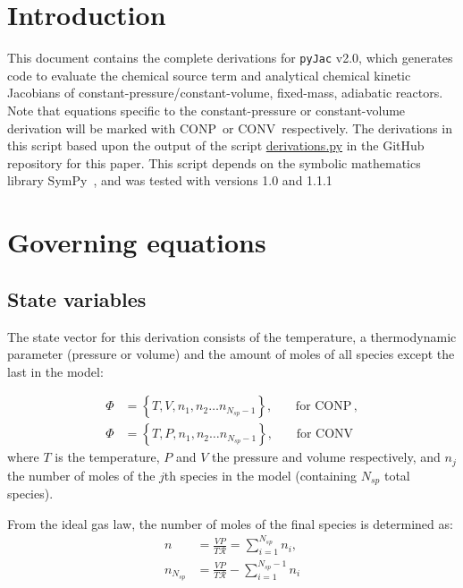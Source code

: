 \documentclass[12pt]{article}
\newcommand{\ns}{\ensuremath{{N_{sp}}}}
\newcommand{\conp}{CONP}
\newcommand{\conv}{CONV}
\newcommand{\dconp}{\ensuremath{,\qquad\text{for \conp}}}
\newcommand{\dconv}{\ensuremath{,\qquad\text{for \conv}}}
\newcommand{\Ru}{\ensuremath{\mathcal{R}}}
\begin{document}
\section{Introduction}
This document contains the complete derivations for \texttt{pyJac} v2.0, which generates code to evaluate the chemical source term and analytical chemical kinetic Jacobians of constant-pressure\slash constant-volume, fixed-mass, adiabatic reactors.
Note that equations specific to the constant-pressure or constant-volume derivation will be marked with \conp~or \conv~respectively.
The derivations in this script based upon the output of the script \href{https://github.com/arghdos/SPyJac-paper/blob/master/derivations/scripts/derivations.py}{derivations.py} in the GitHub repository for this paper.
This script depends on the symbolic mathematics library SymPy~\cite{sympy}, and was tested with versions 1.0 and 1.1.1

\section{Governing equations}
\subsection{State variables}
The state vector for this derivation consists of the temperature, a thermodynamic parameter (pressure or volume) and the amount of moles of all species except the last in the model:

\begin{subequations}
\begin{align}
\Phi &= \left\{T, V, n_1, n_2 \ldots n_{\ns - 1}\right\}\dconp, \\
\Phi &= \left\{T, P, n_1, n_2 \ldots n_{\ns - 1}\right\}\dconv
\end{align}
\end{subequations}
where $T$ is the temperature, $P$ and $V$ the pressure and volume respectively, and $n_j$ the number of moles of the $j$th species in the model (containing $\ns$ total species).

From the ideal gas law, the number of moles of the final species is determined as:
\begin{align}
n &= \frac{V P}{T \Ru} = \sum_{i=1}^{\ns}{n_i}, \label{e:source_moles}\\
n_{\ns} &= \frac{V P}{T \Ru} - \sum_{i=1}^{\ns - 1}{n_i}
\end{align}
\end{document}
